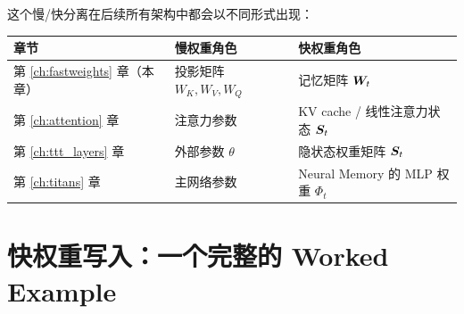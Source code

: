 这个慢/快分离在后续所有架构中都会以不同形式出现：
\begin{center}
\begin{tabular}{lll}
\toprule
章节 & 慢权重角色 & 快权重角色 \\
\midrule
第 \ref{ch:fastweights} 章（本章） & 投影矩阵 $W_K, W_V, W_Q$ & 记忆矩阵 $\boldsymbol{W}_t$ \\
第 \ref{ch:attention} 章 & 注意力参数 & KV cache / 线性注意力状态 $\boldsymbol{S}_t$ \\
第 \ref{ch:ttt_layers} 章 & 外部参数 $\theta$ & 隐状态权重矩阵 $\boldsymbol{S}_t$ \\
第 \ref{ch:titans} 章 & 主网络参数 & Neural Memory 的 MLP 权重 $\Phi_t$ \\
\bottomrule
\end{tabular}
\end{center}

\section{快权重写入：一个完整的 Worked Example}
\label{sec:fastweights_worked}

